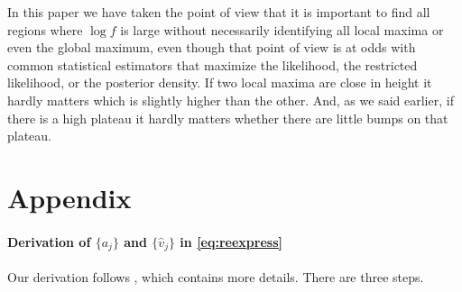 \documentclass{report}
\begin{document}
In this paper we have taken the point of view that it is important to find all regions where $\log f$ is large without necessarily identifying all local maxima or even the global maximum, even though that point of view is at odds with common statistical estimators that maximize the likelihood, the restricted likelihood, or the posterior density.  If two local maxima are close in height it hardly matters which is slightly higher than the other.  And, as we said earlier, if there is a high plateau it hardly matters whether there are little bumps on that plateau.

\section{Appendix}
\paragraph{Derivation of $\{a_j\}$ and $\{\hat v_j\}$ in \eqref{eq:reexpress}}  Our derivation follows \cite{hodges:2013},
which contains more details.  There are three steps.
\end{document}
